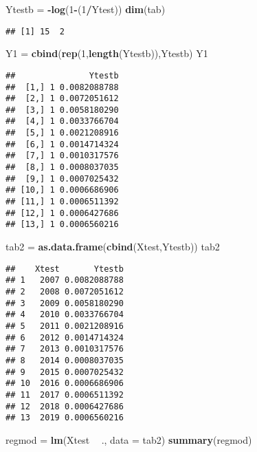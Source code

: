\documentclass[
]{article}
\newenvironment{Shaded}{\begin{snugshade}}{\end{snugshade}}
\newcommand{\DataTypeTok}[1]{\textcolor[rgb]{0.13,0.29,0.53}{#1}}
\newcommand{\DecValTok}[1]{\textcolor[rgb]{0.00,0.00,0.81}{#1}}
\newcommand{\KeywordTok}[1]{\textcolor[rgb]{0.13,0.29,0.53}{\textbf{#1}}}
\newcommand{\NormalTok}[1]{#1}
\newcommand{\OperatorTok}[1]{\textcolor[rgb]{0.81,0.36,0.00}{\textbf{#1}}}
\newcommand{\StringTok}[1]{\textcolor[rgb]{0.31,0.60,0.02}{#1}}
\begin{document}
\begin{Shaded}
\begin{Highlighting}[]
\NormalTok{Ytestb =}\StringTok{ }\OperatorTok{-}\KeywordTok{log}\NormalTok{(}\DecValTok{1}\OperatorTok{-}\NormalTok{(}\DecValTok{1}\OperatorTok{/}\NormalTok{Ytest))}
\KeywordTok{dim}\NormalTok{(tab)}
\end{Highlighting}
\end{Shaded}

\begin{verbatim}
## [1] 15  2
\end{verbatim}

\begin{Shaded}
\begin{Highlighting}[]
\NormalTok{Y1 =}\StringTok{ }\KeywordTok{cbind}\NormalTok{(}\KeywordTok{rep}\NormalTok{(}\DecValTok{1}\NormalTok{,}\KeywordTok{length}\NormalTok{(Ytestb)),Ytestb)}
\NormalTok{Y1}
\end{Highlighting}
\end{Shaded}

\begin{verbatim}
##               Ytestb
##  [1,] 1 0.0082088788
##  [2,] 1 0.0072051612
##  [3,] 1 0.0058180290
##  [4,] 1 0.0033766704
##  [5,] 1 0.0021208916
##  [6,] 1 0.0014714324
##  [7,] 1 0.0010317576
##  [8,] 1 0.0008037035
##  [9,] 1 0.0007025432
## [10,] 1 0.0006686906
## [11,] 1 0.0006511392
## [12,] 1 0.0006427686
## [13,] 1 0.0006560216
\end{verbatim}

\begin{Shaded}
\begin{Highlighting}[]
\NormalTok{tab2 =}\StringTok{ }\KeywordTok{as.data.frame}\NormalTok{(}\KeywordTok{cbind}\NormalTok{(Xtest,Ytestb))}
\NormalTok{tab2}
\end{Highlighting}
\end{Shaded}

\begin{verbatim}
##    Xtest       Ytestb
## 1   2007 0.0082088788
## 2   2008 0.0072051612
## 3   2009 0.0058180290
## 4   2010 0.0033766704
## 5   2011 0.0021208916
## 6   2012 0.0014714324
## 7   2013 0.0010317576
## 8   2014 0.0008037035
## 9   2015 0.0007025432
## 10  2016 0.0006686906
## 11  2017 0.0006511392
## 12  2018 0.0006427686
## 13  2019 0.0006560216
\end{verbatim}

\begin{Shaded}
\begin{Highlighting}[]
\NormalTok{regmod =}\StringTok{ }\KeywordTok{lm}\NormalTok{(Xtest }\OperatorTok{~}\StringTok{ }\NormalTok{., }\DataTypeTok{data =}\NormalTok{ tab2)}
\KeywordTok{summary}\NormalTok{(regmod)}
\end{Highlighting}
\end{Shaded}
\end{document}
